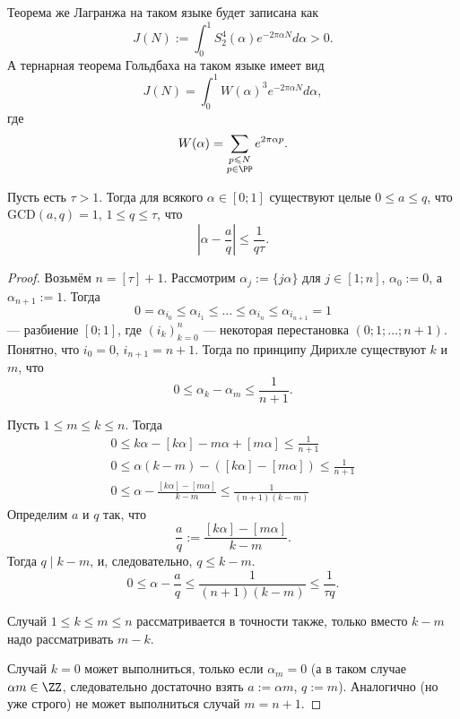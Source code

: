 \documentclass[12pt,a4paper]{article}
\newcommand{\GCD}{\mathrm{GCD}}
\begin{document}
    Теорема же Лагранжа на таком языке будет записана как
    \[J(N) := \int_0^1 S_2^4(\alpha) e^{-2\pi \alpha N} d\alpha > 0.\]
    А тернарная теорема Гольдбаха на таком языке имеет вид
    \[J(N) = \int_0^1 W(\alpha)^3 e^{-2\pi \alpha N} d\alpha,\]
    где
    \[W(\alpha) = \sum_{\substack{p \leqslant N\\ p \in \PP}} e^{2\pi \alpha p}.\]

    \begin{theorem}
        Пусть есть $\tau > 1$. Тогда для всякого $\alpha \in [0; 1]$ существуют целые $0 \leqslant a \leqslant q$, что $\GCD(a, q) = 1$, $1 \leqslant q \leqslant \tau$, что
        \[\left|\alpha - \frac{a}{q}\right|  \leqslant \frac{1}{q \tau}.\]
    \end{theorem}

    \begin{proof}
        Возьмём $n = [\tau] + 1$. Рассмотрим $\alpha_j := \{j\alpha\}$ для $j \in [1; n]$, $\alpha_0 := 0$, а $\alpha_{n+1} := 1$. Тогда
        \[0 = \alpha_{i_0} \leqslant \alpha_{i_1} \leqslant \dots \leqslant \alpha_{i_n} \leqslant \alpha_{i_{n+1}} = 1\]
        --- разбиение $[0; 1]$, где $(i_k)_{k=0}^{n}$ --- некоторая перестановка $(0; 1; \dots; n+1)$. Понятно, что $i_0 = 0$, $i_{n+1} = n+1$. Тогда по принципу Дирихле существуют $k$ и $m$, что
        \[0 \leqslant \alpha_{k} - \alpha_{m} \leqslant \frac{1}{n+1}.\]

        Пусть $1 \leqslant m \leqslant k \leqslant n$. Тогда
        \begin{gather*}
            0 \leqslant k \alpha - [k \alpha] - m \alpha + [m \alpha] \leqslant \frac{1}{n+1}\\
            0 \leqslant \alpha(k-m) - ([k \alpha] - [m \alpha]) \leqslant \frac{1}{n+1}\\
            0 \leqslant \alpha - \frac{[k \alpha] - [m \alpha]}{k-m} \leqslant \frac{1}{(n+1)(k-m)}
        \end{gather*}
        Определим $a$ и $q$ так, что
        \[\frac{a}{q} := \frac{[k \alpha] - [m \alpha]}{k-m}.\]
        Тогда $q \mid k-m$, и, следовательно, $q \leqslant k-m$.
        \[0 \leqslant \alpha - \frac{a}{q} \leqslant \frac{1}{(n+1)(k-m)} \leqslant \frac{1}{\tau q}.\]

        Случай $1 \leqslant k \leqslant m \leqslant n$ рассматривается в точности также, только вместо $k-m$ надо рассматривать $m-k$.

        Случай $k = 0$ может выполниться, только если $\alpha_m = 0$ (а в таком случае $\alpha m \in \ZZ$, следовательно достаточно взять $a := \alpha m$, $q := m$). Аналогично (но уже строго) не может выполниться случай $m = n+1$.


\end{proof}
\end{document}
